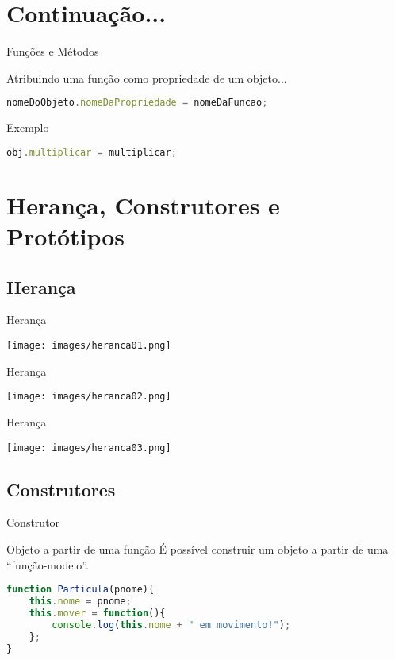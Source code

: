 \documentclass[xcolor=dvipsnames,table]{beamer}
\begin{document}
\section{Continuação...}
\begin{frame}[fragile]{Funções e Métodos}
	\begin{block}{Atribuindo uma função como propriedade de um objeto...}
		\begin{lstlisting}[language=JavaScript]
nomeDoObjeto.nomeDaPropriedade = nomeDaFuncao;
\end{lstlisting}	
	\end{block} \pause
	\begin{block}{Exemplo}
		\begin{lstlisting}[language=JavaScript]
obj.multiplicar = multiplicar;
\end{lstlisting}	
	\end{block}
\end{frame}

\section{Herança, Construtores e Protótipos}
\subsection{Herança}
\begin{frame}{Herança}
	\begin{center}
		\texttt{[image: images/heranca01.png]}
	\end{center}
\end{frame}

\begin{frame}{Herança}
	\begin{center}
		\texttt{[image: images/heranca02.png]}
	\end{center}
\end{frame}

\begin{frame}{Herança}
	\begin{center}
		\texttt{[image: images/heranca03.png]}
	\end{center}
\end{frame}

\subsection{Construtores}
\begin{frame}[fragile]{Construtor}
	\begin{block}{Objeto a partir de uma função}
		É possível construir um objeto a partir de uma ``função-modelo''.
		\begin{lstlisting}[language=JavaScript]
function Particula(pnome){
	this.nome = pnome;
	this.mover = function(){
		console.log(this.nome + " em movimento!");
	};
}
\end{lstlisting}	
	\end{block}
\end{frame}
\end{document}
